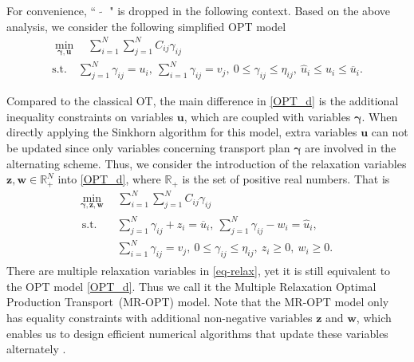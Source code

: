 \documentclass[review,hidelinks,onefignum,onetabnum]{siamart220329}
\begin{document}
For convenience, `` $\widetilde{\;\;}$ " is dropped in the following context.
Based on the above analysis, we consider the following simplified OPT model 
 \begin{equation}\label{OPT_d}
     \begin{gathered}
     \min_{\bm{\gamma,u}} \quad \sum_{i=1}^{N}\sum_{j=1}^{N} C_{ij} \gamma_{ij} \\
     \mathrm{s.t.} \quad \sum_{j=1}^{N} \gamma_{ij} = u_i,  \ \sum_{i=1}^{N} \gamma_{ij} = v_j, \ 
        0 \leq \gamma_{ij} \leq \eta_{ij}, \ \hat{u}_i \leq u_i \leq \overline{u}_i.  
     \end{gathered}
 \end{equation}

Compared to the classical OT, the main difference in \cref{OPT_d} is the additional inequality constraints on variables $\bm{u}$, which are coupled with variables $\bm{\gamma}$. 
When directly applying the Sinkhorn algorithm for this model, extra variables $\bm{u}$ can not be updated since only variables concerning transport plan $\bm{\gamma}$ are involved in the alternating scheme.
Thus, we consider the introduction of the relaxation variables $\bm{z},\bm{w}\in \mathbb{R}_{+}^{N}$ into \cref{OPT_d}, where $\mathbb{R_+}$ is the set of positive real numbers. That is
\begin{equation}\label{eq-relax}
\begin{gathered}
        \min_{\bm{\gamma}, \bm{z},\bm{w}} \quad \sum_{i=1}^{N}\sum_{j=1}^{N} C_{ij} \gamma_{ij} \\
        \begin{aligned}
        \text{s.t.} & \quad \sum_{j=1}^{N} \gamma_{ij} + z_i = \overline{u}_i, \ \sum_{j=1}^{N} \gamma_{ij} - w_i = \hat{u}_i, \\
        & \quad  \sum_{i=1}^N \gamma_{ij} = v_j, \
        0 \leq \gamma_{ij} \leq \eta_{ij}, \ z_i \geq 0, \ w_i \geq 0. 
        \end{aligned}
\end{gathered}
\end{equation}
There are multiple relaxation variables in \cref{eq-relax},
yet it is still equivalent to the OPT model \cref{OPT_d}.
Thus we call it the Multiple Relaxation Optimal Production Transport~(MR-OPT) model.
Note that the MR-OPT model only has equality constraints with additional non-negative variables $\bm{z}$ and $\bm{w}$, which enables us to design efficient numerical algorithms that update these variables alternately \cite{nocedal1999numerical}. 
\end{document}
